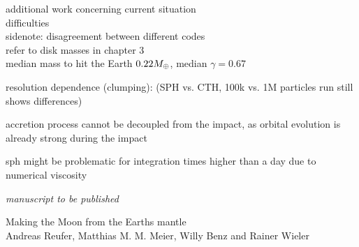 additional work concerning
current situation\\

difficulties\\

sidenote: disagreement between different codes\\

refer to disk masses in chapter 3\\

\cite{Chambers:2001p2105}
median mass to hit the Earth $0.22 M_{\oplus}$, median $\gamma = 0.67$

resolution dependence (clumping):
\citep{Canup:2010p3713} (SPH vs. CTH, 100k vs. 1M particles run still shows differences)

accretion process cannot be decoupled from the impact, as orbital evolution is already strong during the impact 

sph might be problematic for integration times higher than a day due to numerical viscosity \citep{Canup:2004p115} 


\cleardoublepage
\thispagestyle{empty}
\begin{flushright} \emph{manuscript to be published} \end{flushright}
{\Large Making the Moon from the Earths mantle} \vspace{0.5cm}\\
Andreas Reufer, Matthias M. M. Meier, Willy Benz and Rainer Wieler\\

